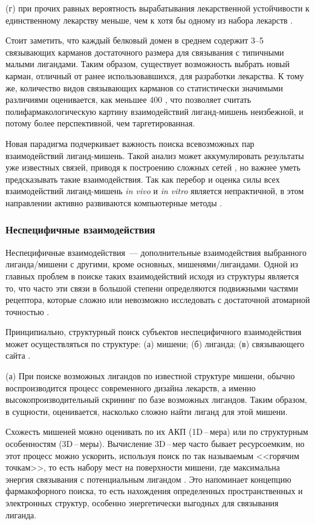 \documentclass[a4paper,14pt]{article}         %
\begin{document}
(г) при прочих равных  вероятность вырабатывания лекарственной устойчивости к единственному лекарству меньше, чем к хотя бы одному из набора лекарств \cite{Anighoro2014}.

Стоит заметить, что каждый белковый домен в среднем содержит 3--5 связывающих карманов достаточного размера для связывания с типичными малыми лигандами\cite{Skolnick2015}. Таким образом, существует возможность выбрать новый карман, отличный от ранее использовавшихся, для разработки лекарства. К тому же, количество видов связывающих карманов со статистически значимыми различиями оценивается, как меньшее 400 \cite{Skolnick2015}, что позволяет считать полифармакологическую картину взаимодействий лиганд-мишень неизбежной, и потому более перспективной, чем таргетированная.

Новая парадигма подчеркивает важность поиска всевозможных пар взаимодействий лиганд-мишень. Такой анализ может аккумулировать результаты уже известных связей, приводя к построению сложных сетей \cite{Anighoro2014}, но важнее уметь предсказывать такие взаимодействия. Так как перебор и оценка силы всех взаимодействий лиганд-мишень \textit{in vivo} и \textit{in vitro} является непрактичной, в этом направлении активно развиваются компьютерные методы \cite{Chaudhari}.

\subsubsection{Неспецифичные взаимодействия}
Неспецифичные взаимодействия~--- дополнительные взаимодействия выбранного лиганда/мишени с другими, кроме основных, мишенями/лигандами. Одной из главных проблем в поиске таких взаимодействий исходя из структуры является то, что часто эти связи в большой степени определяются подвижными частями рецептора, которые сложно или невозможно исследовать с достаточной атомарной точностью \cite{Loving}.

Принципиально, структурный поиск субъектов неспецифичного взаимодействия может осуществляться по структуре: (а) мишени; (б) лиганда; (в) связывающего сайта \cite{Rognan2010}.

(а) При поиске возможных лигандов по известной структуре мишени, обычно воспроизводится процесс современного дизайна лекарств, а именно высокопроизводительный скрининг по базе возможных лигандов. Таким образом, в сущности, оценивается, насколько сложно найти лиганд для этой мишени. 

Схожесть мишеней можно оценивать по их АКП (1D\,--\,мера) или по структурным особенностям (3D\,--\,меры). Вычисление 3D\,--\,мер часто бывает ресурсоемким, но этот процесс можно ускорить, используя поиск по так называемым <<горячим точкам>>, то есть набору мест на поверхности мишени, где максимальна энергия связывания с потенциальным лигандом \cite{Hall2015}. Это напоминает концепцию фармакофорного поиска, то есть нахождения определенных пространственных и электронных структур, особенно энергетически выгодных для связывания лиганда.
\end{document}
